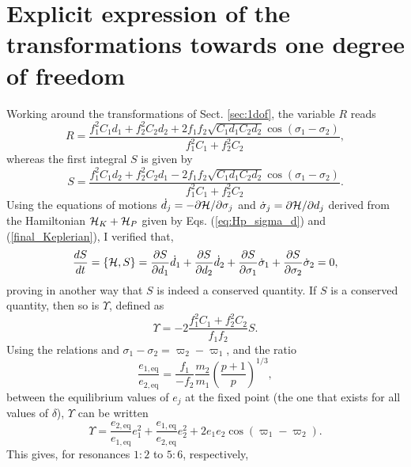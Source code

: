\documentclass[12pt,a4paper,oneside]{article}
\begin{document}
\section{Explicit expression of the transformations towards one degree of freedom}\label{sec:first_integrals}

Working around the transformations of Sect. \ref{sec:1dof}, the variable $R$ reads
\begin{equation}
	R=\frac{f_1^2C_1d_1+f_2^2C_2d_2+2f_1f_2\sqrt{C_1d_1C_2d_2}\cos(\sigma_1-\sigma_2)}{f_1^2C_1+f_2^2C_2},
\end{equation}
whereas the first integral $S$ is given by
\begin{equation}
	S=\frac{f_1^2C_1d_2+f_2^2C_2d_1-2f_1f_2\sqrt{C_1d_1C_2d_2}\cos(\sigma_1-\sigma_2)}{f_1^2C_1+f_2^2C_2}.
\end{equation}
Using the equations of motions $\dot{d}_j=-\partial\mathcal{H}/\partial\sigma_j$ and $\dot{\sigma}_j=\partial\mathcal{H}/\partial d_j$ derived from the Hamiltonian $\mathcal{H}_K+\mathcal{H}_P$ given by Eqs. (\ref{eq:Hp_sigma_d}) and (\ref{final_Keplerian}), I verified that,
\begin{equation}
	\frac{dS}{dt}=\left\lbrace\mathcal{H},S\right\rbrace=\frac{\partial S}{\partial d_1}\dot{d}_1+\frac{\partial S}{\partial d_2}\dot{d}_2+\frac{\partial S}{\partial \sigma_1}\dot{\sigma}_1+\frac{\partial S}{\partial \sigma_2}\dot{\sigma}_2=0,
\end{equation}
proving in another way that $S$ is indeed a conserved quantity. If $S$ is a conserved quantity, then so is $\Upsilon$, defined as
\begin{equation}
	\Upsilon=-2\frac{f_1^2C_1+f_2^2C_2}{f_1f_2}S.
\end{equation}
Using the relations  and $\sigma_1-\sigma_2=\varpi_2-\varpi_1$, and the ratio
\begin{equation}
	\frac{e_{1,\text{eq}}}{e_{2,\text{eq}}}=\frac{f_1}{-f_2}\frac{m_2}{m_1}\left(\frac{p+1}{p}\right)^{1/3},
\end{equation}
between the equilibrium values of $e_j$ at the fixed point (the one that exists for all values of $\delta$), $\Upsilon$ can be written
\begin{equation}
	\Upsilon=\frac{e_{2,\text{eq}}}{e_{1,\text{eq}}}e_1^2+\frac{e_{1,\text{eq}}}{e_{2,\text{eq}}}e_2^2+2e_1e_2\cos(\varpi_1-\varpi_2).
\end{equation}
This gives, for resonances $1:2$ to $5:6$, respectively,
\end{document}

